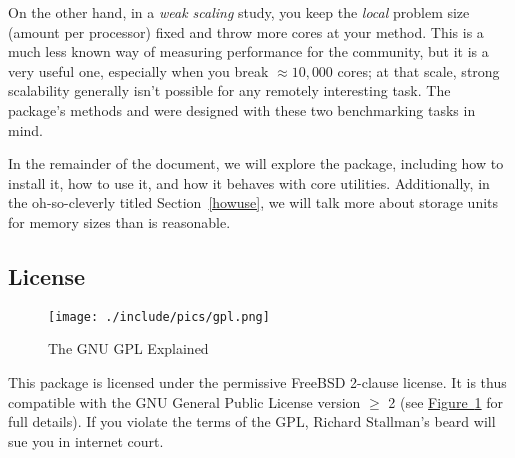 On the other hand, in a \emph{weak scaling} study, you 
keep the \emph{local} problem size (amount per processor) fixed and throw more 
cores at your method.  This is a much less known way of measuring performance 
for the \R community, but it is a very useful one, especially when 
you break $\approx 10,000$ cores; at that scale, strong scalability generally 
isn't possible for any remotely interesting task.  The  package's 
methods  and  were designed with these two 
benchmarking tasks in mind.

In the remainder of the document, we will explore the  package, 
including how to install it, how to use it, and how it behaves with core 
\R utilities.  Additionally, in the oh-so-cleverly titled
Section~\ref{howuse}, we will talk more about storage units for memory sizes 
than is reasonable.


\subsection{License}

\begin{figure}[th]
  \centering
  \texttt{[image: ./include/pics/gpl.png]}
  \caption{The GNU GPL Explained}
  \label{fig:gnu}
\end{figure}

This package is licensed under the permissive FreeBSD 2-clause license.  It is
thus compatible with the GNU General Public License version $\geq$ 2 (see 
\hyperref[fig:gnu]{Figure~\ref{fig:gnu}} for full details).  If you 
violate the terms of the GPL, Richard Stallman's beard will sue you in 
internet court.
